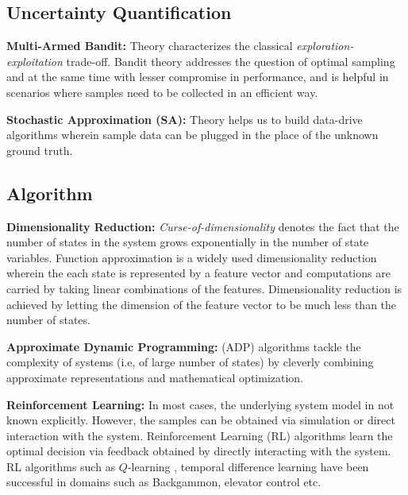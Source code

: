 \subsection{Uncertainty Quantification}
\textbf{Multi-Armed Bandit:} Theory \cite{auer} characterizes the classical \emph{exploration-exploitation} trade-off. Bandit theory addresses the question of optimal sampling and at the same time with lesser compromise in performance, and is helpful in scenarios where samples need to be collected in an efficient way.\par
\textbf{Stochastic Approximation (SA):} Theory \cite{sa} helps us to build data-drive algorithms wherein sample data can be plugged in the place of the unknown ground truth.
\subsection{Algorithm}
\textbf{Dimensionality Reduction:}
\emph{Curse-of-dimensionality} denotes the fact that the number of states in the system grows exponentially in the number of state variables. 
Function approximation is a widely used dimensionality reduction wherein the each state is represented by a feature vector and computations are carried by taking linear combinations of the features. Dimensionality reduction is achieved by letting the dimension of the feature vector to be much less than the number of states.\par
\textbf{Approximate Dynamic Programming:} (ADP) algorithms \cite{dpchapter} tackle the complexity of systems (i.e, of large number of states) by cleverly combining approximate representations and mathematical optimization.\par
\begin{comment}
\begin{center}
\textbf{Multiple Players}
\end{center}
Game Theory is a natural framework to address decision problems involving multiple self-interested parties. Analyzing the Nash Equilibrium of a game offers insights on the kind of outcomes expected in such a scenario. Stochastic Games \cite{} is an outgrowth of MDP and game theory. Due to the \emph{curse}, computing exact Nash equilibria for stochastic games is difficult and research focus here would be to compute approximate Nash equilibria for stochastic games with large number of states.\par
\end{comment}
\textbf{Reinforcement Learning:} In most cases, the underlying system model in not known explicitly. However, the samples can be obtained via simulation or direct interaction with the system. Reinforcement Learning (RL) algorithms \cite{sutton} learn the optimal decision via feedback obtained by directly interacting with the system. 
RL algorithms such as $Q$-learning \cite{qlearn}, temporal difference learning \cite{Tsit} have been successful in domains such as Backgammon, elevator control etc.

